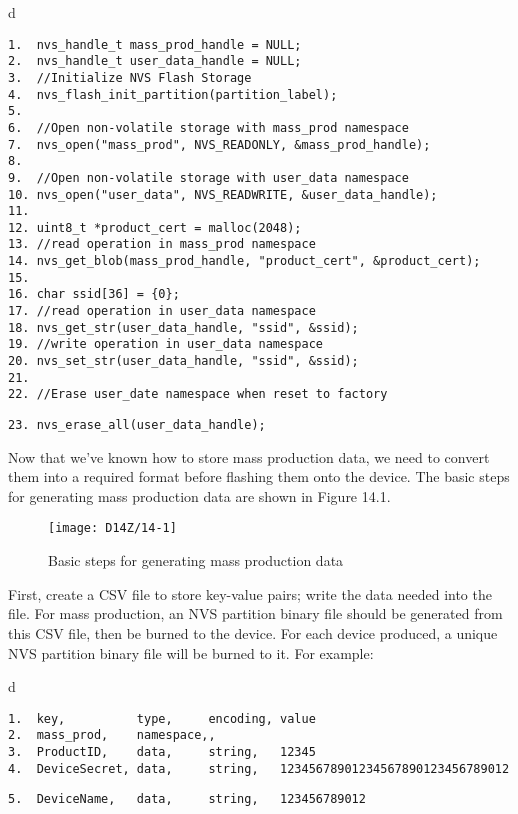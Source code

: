 \documentclass[a4paper,12pt]{book}
\begin{document}
\begin{codebloc}
\begin{tabular}{d}
\vspace{2pt}
\begin{verbatim}
1.  nvs_handle_t mass_prod_handle = NULL;
2.  nvs_handle_t user_data_handle = NULL;
3.  //Initialize NVS Flash Storage
4.  nvs_flash_init_partition(partition_label);
5.  
6.  //Open non-volatile storage with mass_prod namespace
7.  nvs_open("mass_prod", NVS_READONLY, &mass_prod_handle);
8.  
9.  //Open non-volatile storage with user_data namespace
10. nvs_open("user_data", NVS_READWRITE, &user_data_handle);
11. 
12. uint8_t *product_cert = malloc(2048);
13. //read operation in mass_prod namespace
14. nvs_get_blob(mass_prod_handle, "product_cert", &product_cert);
15. 
16. char ssid[36] = {0};
17. //read operation in user_data namespace
18. nvs_get_str(user_data_handle, "ssid", &ssid);
19. //write operation in user_data namespace
20. nvs_set_str(user_data_handle, "ssid", &ssid);
21. 
22. //Erase user_date namespace when reset to factory
\end{verbatim}
\verb|23. nvs_erase_all(user_data_handle);|
\end{tabular}
\end{codebloc}


Now that we’ve known how to store mass production data, we need to convert them into a required format before flashing them onto the device. The basic steps for generating mass production data are shown in Figure 14.1.
\begin{figure}[ht]
    \centering
    \texttt{[image: D14Z/14-1]}
    \caption{Basic steps for generating mass production data}
\end{figure}

First, create a CSV file to store key-value pairs; write the data needed into the file. For mass production, an NVS partition binary file should be generated from this CSV file, then be burned to the device. For each device produced, a unique NVS partition binary file will be burned to it. For example:

\begin{codebloc}
\begin{tabular}{d}
\vspace{2pt}
\begin{verbatim}
1.  key,          type,     encoding, value
2.  mass_prod,    namespace,,
3.  ProductID,    data,     string,   12345
4.  DeviceSecret, data,     string,   12345678901234567890123456789012\end{verbatim}
\verb|5.  DeviceName,   data,     string,   123456789012|
\end{tabular}
\end{codebloc}
\end{document}
